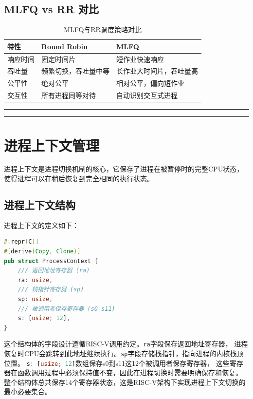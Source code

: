 \subsection{MLFQ vs RR 对比}

\begin{table}[htbp]
\centering
\caption{MLFQ与RR调度策略对比}
\label{tab:mlfq-vs-rr}
\begin{tabular}{|l|l|l|}
\hline
\textbf{特性} & \textbf{Round Robin} & \textbf{MLFQ} \\
\hline
响应时间 & 固定时间片 & 短作业快速响应 \\
\hline
吞吐量 & 频繁切换，吞吐量中等 & 长作业大时间片，吞吐量高 \\
\hline
公平性 & 绝对公平 & 相对公平，偏向短作业 \\
\hline
交互性 & 所有进程同等对待 & 自动识别交互式进程 \\
\hline
\end{tabular}
\end{table}

\noindent
\rule{0.4\textwidth}{0.4pt}
\hfill
{}
\hfill
\rule{0.4\textwidth}{0.4pt}

\section{进程上下文管理}

进程上下文是进程切换机制的核心，它保存了进程在被暂停时的完整CPU状态，
使得进程可以在稍后恢复到完全相同的执行状态。

\subsection{进程上下文结构}

进程上下文的定义如下：

\begin{lstlisting}[language=Rust,caption={进程上下文结构}, label={lst:process-context}]
#[repr(C)]
#[derive(Copy, Clone)]
pub struct ProcessContext {
    /// 返回地址寄存器 (ra)
    ra: usize,
    /// 栈指针寄存器 (sp)
    sp: usize,
    /// 被调用者保存寄存器 (s0-s11)
    s: [usize; 12],
}
\end{lstlisting}

这个结构体的字段设计遵循RISC-V调用约定。\lstinline[language=Rust]{ra}字段保存返回地址寄存器，
进程恢复时CPU会跳转到此地址继续执行。\lstinline[language=Rust]{sp}字段存储栈指针，指向进程的内核栈顶位置。
\lstinline[language=Rust]{s: [usize; 12]}数组保存s0到s11这12个被调用者保存寄存器，
这些寄存器在函数调用过程中必须保持值不变，因此在进程切换时需要明确保存和恢复。
整个结构体总共保存14个寄存器状态，这是RISC-V架构下实现进程上下文切换的最小必要集合。

